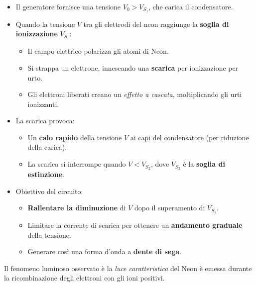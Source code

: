 \documentclass{article}
\begin{document}
\begin{itemize}
\item Il generatore fornisce una tensione $V_0 > V_{S_1}$, che carica il condensatore.



\item Quando la tensione \( V \) tra gli elettrodi del neon raggiunge la \textbf{soglia di ionizzazione} \( V_{S_1} \):
\begin{itemize}
    \item Il campo elettrico polarizza gli atomi di Neon.
    \item Si strappa un elettrone, innescando una \textbf{scarica} per ionizzazione per urto.
    \item Gli elettroni liberati creano un \textit{effetto a cascata}, moltiplicando gli urti ionizzanti.
\end{itemize}

\item La scarica provoca:
\begin{itemize}
    \item Un \textbf{calo rapido} della tensione \( V \) ai capi del condensatore (per riduzione della carica).
    \item La scarica si interrompe quando \( V < V_{S_2} \), dove \( V_{S_2} \) è la \textbf{soglia di estinzione}.
\end{itemize}

\item Obiettivo del circuito:
\begin{itemize}
    \item \textbf{Rallentare la diminuzione} di \( V \) dopo il superamento di \( V_{S_1} \).
    \item Limitare la corrente di scarica per ottenere un \textbf{andamento graduale} della tensione.
    \item Generare così una forma d'onda a \textbf{dente di sega}.
\end{itemize}
\end{itemize}
Il fenomeno luminoso osservato è la \textit{luce caratteristica} del Neon è emessa durante la ricombinazione degli elettroni con gli ioni positivi.
\end{document}
